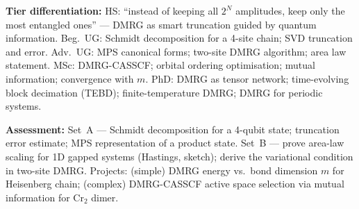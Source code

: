 \documentclass[11pt,a4paper]{article}
\begin{document}
\begin{tcolorbox}[modulebox, title={Module~II.1 / L07: Density Matrix Renormalisation Group}]
\medskip\textbf{Tier differentiation:}
HS: ``instead of keeping all $2^N$ amplitudes, keep only the most entangled ones'' ---
DMRG as smart truncation guided by quantum information.
Beg.\ UG: Schmidt decomposition for a 4-site chain; SVD truncation and error.
Adv.\ UG: MPS canonical forms; two-site DMRG algorithm; area law statement.
MSc: DMRG-CASSCF; orbital ordering optimisation; mutual information; convergence with $m$.
PhD: DMRG as tensor network; time-evolving block decimation (TEBD); finite-temperature DMRG;
DMRG for periodic systems.

\medskip\textbf{Assessment:}
Set~A --- Schmidt decomposition for a 4-qubit state; truncation error estimate;
MPS representation of a product state.
Set~B --- prove area-law scaling for 1D gapped systems (Hastings, sketch);
derive the variational condition in two-site DMRG.
Projects: (simple) DMRG energy vs.\ bond dimension $m$ for Heisenberg chain;
(complex) DMRG-CASSCF active space selection via mutual information for Cr$_2$ dimer.
\end{tcolorbox}

\medskip
\end{document}
